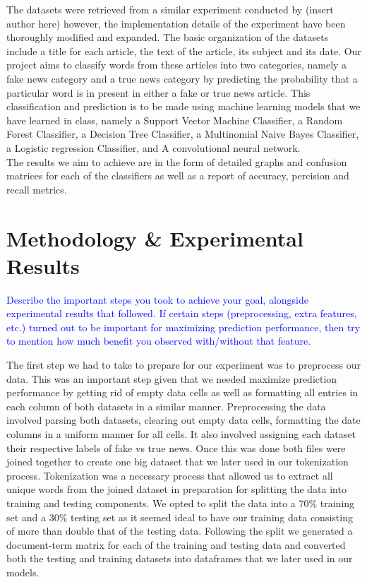 \documentclass[10pt,twocolumn,letterpaper]{article}
\begin{document}
The datasets were retrieved from a similar experiment conducted by (insert author here) however, the implementation details of the experiment have been thoroughly modified and expanded. The basic organization of the datasets include a title for each article, the text of the article, its subject and its date. Our project aims to classify words from these articles into two categories, namely a fake news category and a true news category by predicting the probability that a particular word is in present in either a fake or true news article. This classification and prediction is to be made using machine learning models that we have learned in class, namely a Support Vector Machine Classifier, a Random Forest Classifier, a Decision Tree Classifier, a Multinomial Naive Bayes Classifier, a Logistic regression Classifier, and A convolutional neural network. \\

The results we aim to achieve are in the form of detailed graphs and confusion matrices for each of the classifiers as well as a report of accuracy, percision and recall metrics. 


\section{Methodology \& Experimental Results}

\textcolor{blue}{Describe the important steps you took to achieve your goal, alongside experimental results that followed. If certain steps (preprocessing, extra features, etc.) turned out to be important for maximizing prediction performance, then try to mention how much benefit you observed with/without that feature.}

The first step we had to take to prepare for our experiment was to preprocess our data. This was an important step given that we needed maximize prediction performance by getting rid of empty data cells as well as formatting all entries in each column of both datasets in a similar manner. Preprocessing the data involved parsing both datasets, clearing out empty data cells, formatting the date columns in a uniform manner for all cells. It also involved assigning each dataset their respective labels of fake vs true news. Once this was done  both files were joined together to create one big dataset that we later used in our tokenization process. Tokenization was a necessary process that allowed us to extract all unique words from the joined dataset in preparation for splitting the data into training and testing components. We opted to split the data into a 70\% training set and a 30\% testing set as it seemed ideal to have our training data consisting of more than double that of the testing data. Following the split we generated a document-term matrix for each of the training and testing data and converted both the testing and training datasets into dataframes that we later used in our models. \\
\end{document}
